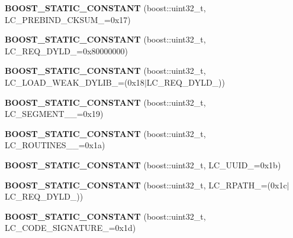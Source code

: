 \begin{DoxyCompactItemize}
\item 
{\bfseries B\+O\+O\+S\+T\+\_\+\+S\+T\+A\+T\+I\+C\+\_\+\+C\+O\+N\+S\+T\+A\+NT} (boost\+::uint32\+\_\+t, L\+C\+\_\+\+P\+R\+E\+B\+I\+N\+D\+\_\+\+C\+K\+S\+U\+M\+\_\+=0x17)\hypertarget{a00194_a0f968b033a624306ac18c80019f4c9bb}{}\label{a00194_a0f968b033a624306ac18c80019f4c9bb}

\item 
{\bfseries B\+O\+O\+S\+T\+\_\+\+S\+T\+A\+T\+I\+C\+\_\+\+C\+O\+N\+S\+T\+A\+NT} (boost\+::uint32\+\_\+t, L\+C\+\_\+\+R\+E\+Q\+\_\+\+D\+Y\+L\+D\+\_\+=0x80000000)\hypertarget{a00194_a38556d418f79efda908e855b2fada64e}{}\label{a00194_a38556d418f79efda908e855b2fada64e}

\item 
{\bfseries B\+O\+O\+S\+T\+\_\+\+S\+T\+A\+T\+I\+C\+\_\+\+C\+O\+N\+S\+T\+A\+NT} (boost\+::uint32\+\_\+t, L\+C\+\_\+\+L\+O\+A\+D\+\_\+\+W\+E\+A\+K\+\_\+\+D\+Y\+L\+I\+B\+\_\+=(0x18$\vert$\+L\+C\+\_\+\+R\+E\+Q\+\_\+\+D\+Y\+L\+D\+\_\+))\hypertarget{a00194_ac183a506054948c8bf2b0f62e5afbc2a}{}\label{a00194_ac183a506054948c8bf2b0f62e5afbc2a}

\item 
{\bfseries B\+O\+O\+S\+T\+\_\+\+S\+T\+A\+T\+I\+C\+\_\+\+C\+O\+N\+S\+T\+A\+NT} (boost\+::uint32\+\_\+t, L\+C\+\_\+\+S\+E\+G\+M\+E\+N\+T\+\_\+\_\+=0x19)\hypertarget{a00194_a95224d2abc26fcd971f8abb80c68e822}{}\label{a00194_a95224d2abc26fcd971f8abb80c68e822}

\item 
{\bfseries B\+O\+O\+S\+T\+\_\+\+S\+T\+A\+T\+I\+C\+\_\+\+C\+O\+N\+S\+T\+A\+NT} (boost\+::uint32\+\_\+t, L\+C\+\_\+\+R\+O\+U\+T\+I\+N\+E\+S\+\_\+\_\+=0x1a)\hypertarget{a00194_af3ee965b42b28daf4af3cf5d303fd465}{}\label{a00194_af3ee965b42b28daf4af3cf5d303fd465}

\item 
{\bfseries B\+O\+O\+S\+T\+\_\+\+S\+T\+A\+T\+I\+C\+\_\+\+C\+O\+N\+S\+T\+A\+NT} (boost\+::uint32\+\_\+t, L\+C\+\_\+\+U\+U\+I\+D\+\_\+=0x1b)\hypertarget{a00194_ab9a1ea56b4daa5742fb6ca86c0c1e0ba}{}\label{a00194_ab9a1ea56b4daa5742fb6ca86c0c1e0ba}

\item 
{\bfseries B\+O\+O\+S\+T\+\_\+\+S\+T\+A\+T\+I\+C\+\_\+\+C\+O\+N\+S\+T\+A\+NT} (boost\+::uint32\+\_\+t, L\+C\+\_\+\+R\+P\+A\+T\+H\+\_\+=(0x1c$\vert$\+L\+C\+\_\+\+R\+E\+Q\+\_\+\+D\+Y\+L\+D\+\_\+))\hypertarget{a00194_aa383ccae1c85ee5f2aed108bd84ba4d2}{}\label{a00194_aa383ccae1c85ee5f2aed108bd84ba4d2}

\item 
{\bfseries B\+O\+O\+S\+T\+\_\+\+S\+T\+A\+T\+I\+C\+\_\+\+C\+O\+N\+S\+T\+A\+NT} (boost\+::uint32\+\_\+t, L\+C\+\_\+\+C\+O\+D\+E\+\_\+\+S\+I\+G\+N\+A\+T\+U\+R\+E\+\_\+=0x1d)\hypertarget{a00194_af5641df120639f5faeeef336f8bb79be}{}\label{a00194_af5641df120639f5faeeef336f8bb79be}


\end{DoxyCompactItemize}
